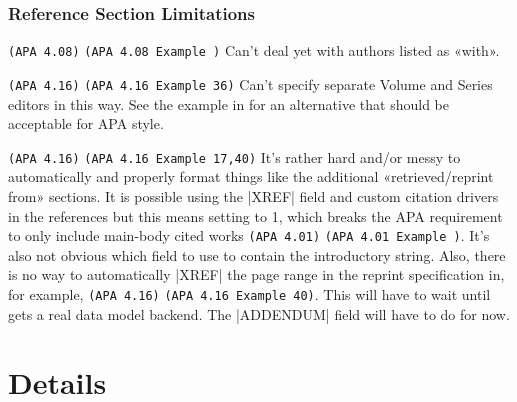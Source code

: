 \documentclass{ltxdockit}
\newcommand\apa[2][]{\ifthenelse{\equal{#1}{}}%
                       {\texttt{(APA #2)}}%
                       {\texttt{(APA #2 Example #1)}}}
\begin{document}
\subsubsection{Reference Section Limitations}

\begin{description}
\item\apa{4.08} Can't deal yet with authors listed as «with».
\item\apa[36]{4.16} Can't specify separate Volume and Series editors in
  this way. See the example in  for
  an alternative that should be acceptable for APA style.
\item\apa[17,40]{4.16} It's rather hard and/or messy to automatically and
  properly format things like the additional «retrieved/reprint from»
  sections. It is possible using the |XREF| field and custom citation
  drivers in the references but this means setting  to 1,
  which breaks the APA requirement to only include main-body cited works
  \apa{4.01}. It's also not obvious which field to use to contain the
  introductory string. Also, there is no way to automatically |XREF| the
  page range in the reprint specification in, for example, \apa[40]{4.16}.
  This will have to wait until  gets a real data model
  backend. The |ADDENDUM| field will have to do for now.
\end{description}

\section{Details}
\end{document}
